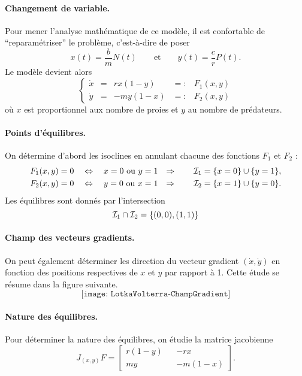\paragraph*{Changement de variable.}
Pour mener l'analyse mathématique de ce modèle, il est confortable de ``reparamétriser'' le problème, c'est-à-dire de poser
$$
x(t) = \frac{b}m N(t)
\qquad \text{et} \qquad
y(t) = \frac{c}r P(t).
$$
Le modèle devient alors
$$
\left\{\begin{array}{rcrcl} 
  \dot x & = & r x (1-y) & =: & F_1(x, y) \\
  \dot y & = & -m y (1-x) & =: & F_2(x, y)
\end{array}\right.
$$
où $x$ est proportionnel aux nombre de proies et $y$ au nombre de prédateurs.

\paragraph*{Points d'équilibres.}
On détermine d'abord les isoclines en annulant chacune des fonctions $F_1$ et $F_2$ :
\begin{align*}
  F_1(x, y) & = 0 \quad \Leftrightarrow \quad x = 0 \text{ ou } y = 1 &
  \Rightarrow \qquad \mathcal{I}_1 & = \{x = 0\} \cup \{y = 1\}, \\
  F_2(x, y) & = 0 \quad \Leftrightarrow \quad y = 0 \text{ ou } x = 1 &
  \Rightarrow \qquad \mathcal{I}_2 & = \{x = 1\} \cup \{y = 0\}.
\end{align*}
Les équilibres sont donnés par l'intersection 
$$
\mathcal{I}_1 \cap \mathcal{I}_2 = \{(0, 0), (1, 1)\}
$$

\paragraph*{Champ des vecteurs gradients.}
On peut également déterminer les direction du vecteur gradient $(\dot x, \dot y)$ en fonction des positions respectives de $x$ et $y$ par rapport à 1. Cette étude se résume dans la figure suivante.
$$
\texttt{[image: LotkaVolterra-ChampGradient]}
$$

\paragraph*{Nature des équilibres.}
Pour déterminer la nature des équilibres, on étudie la matrice jacobienne
$$
J_{(x, y)}F = 
  \left[\begin{array}{ccc} 
    r (1-y) & & -r x \\
    m y & & -m (1-x)
  \end{array}\right].
$$

